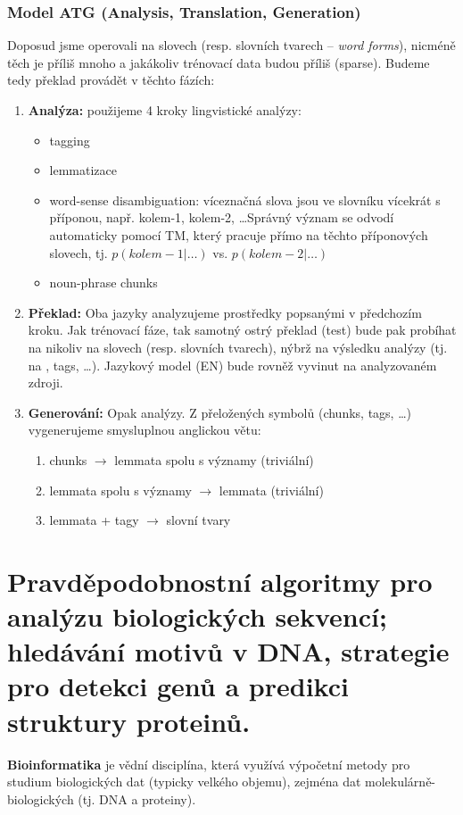 \documentclass[11pt]{report} %
\numberwithin{equation}{section}
\begin{document}
\subsubsection{Model ATG (Analysis, Translation, Generation)}
Doposud jsme operovali na slovech (resp. slovních tvarech -- \textit{word forms}), nicméně těch je příliš mnoho a jakákoliv trénovací data budou příliš  (sparse). Budeme tedy překlad provádět v těchto fázích:
\begin{enumerate}
	\item \textbf{Analýza:} použijeme 4 kroky lingvistické analýzy:
	\begin{itemize}
		\item tagging
		\item lemmatizace
		\item word-sense disambiguation: víceznačná slova jsou ve slovníku vícekrát s příponou, např. kolem-1, kolem-2, \dots Správný význam se odvodí automaticky pomocí TM, který pracuje přímo na těchto příponových slovech, tj. $p(kolem-1|\dots)$ vs. $p(kolem-2|\dots)$
		\item noun-phrase chunks
	\end{itemize}

	\item \textbf{Překlad:} Oba jazyky analyzujeme prostředky popsanými v předchozím kroku. Jak trénovací fáze, tak samotný ostrý překlad (test) bude pak probíhat na nikoliv na slovech (resp. slovních tvarech), nýbrž na výsledku analýzy (tj. na , tags, \dots). Jazykový model (EN) bude rovněž vyvinut na analyzovaném zdroji.
	
	\item \textbf{Generování:} Opak analýzy. Z přeložených symbolů (chunks, tags, \dots) vygenerujeme smysluplnou anglickou větu:
	\begin{enumerate}
		
		
		\item chunks $\rightarrow$ lemmata spolu s významy (triviální)
		\item lemmata spolu s významy $\rightarrow$ lemmata (triviální) 
		\item lemmata + tagy $\rightarrow$ slovní tvary 
	\end{enumerate}
\end{enumerate}








\section{Pravděpodobnostní algoritmy pro analýzu biologických sekvencí; hledávání motivů v DNA, strategie pro detekci genů a predikci struktury proteinů.}
\textbf{Bioinformatika} je vědní disciplína, která využívá výpočetní metody pro studium biologických dat (typicky velkého objemu), zejména dat molekulárně-biologických (tj. DNA a proteiny).
\end{document}
